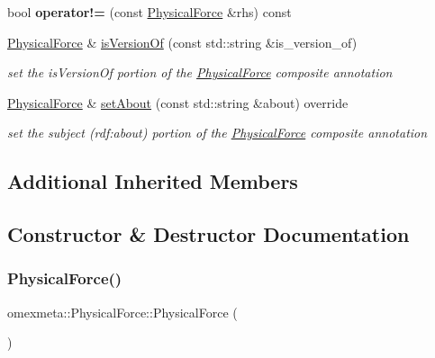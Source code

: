 \begin{DoxyCompactItemize}
\item 
\mbox{\label{classomexmeta_1_1PhysicalForce_aeb7adb235c0caac04c7aa599f98f258a}} 
bool {\bfseries operator!=} (const \hyperlink{classomexmeta_1_1PhysicalForce}{Physical\+Force} \&rhs) const
\item 
\hyperlink{classomexmeta_1_1PhysicalForce}{Physical\+Force} \& \hyperlink{classomexmeta_1_1PhysicalForce_ab05616b46d417cc7376ae58abd4fe0e6}{is\+Version\+Of} (const std\+::string \&is\+\_\+version\+\_\+of)
\begin{DoxyCompactList}\small\item\em set the is\+Version\+Of portion of the \hyperlink{classomexmeta_1_1PhysicalForce}{Physical\+Force} composite annotation \end{DoxyCompactList}\item 
\hyperlink{classomexmeta_1_1PhysicalForce}{Physical\+Force} \& \hyperlink{classomexmeta_1_1PhysicalForce_a77345d665e492085b81d96337711dc35}{set\+About} (const std\+::string \&about) override
\begin{DoxyCompactList}\small\item\em set the subject (rdf\+:about) portion of the \hyperlink{classomexmeta_1_1PhysicalForce}{Physical\+Force} composite annotation \end{DoxyCompactList}\end{DoxyCompactItemize}
\subsection*{Additional Inherited Members}


\subsection{Constructor \& Destructor Documentation}
\mbox{\label{classomexmeta_1_1PhysicalForce_ad5b43ea5489891c45f5ebc4c9b62e44e}} 
\subsubsection{\texorpdfstring{Physical\+Force()}{PhysicalForce()}\hspace{0.1cm}{\footnotesize\ttfamily [1/3]}}
{\footnotesize\ttfamily omexmeta\+::\+Physical\+Force\+::\+Physical\+Force (\begin{DoxyParamCaption}{ }\end{DoxyParamCaption})\hspace{0.3cm}{\ttfamily [delete]}}



